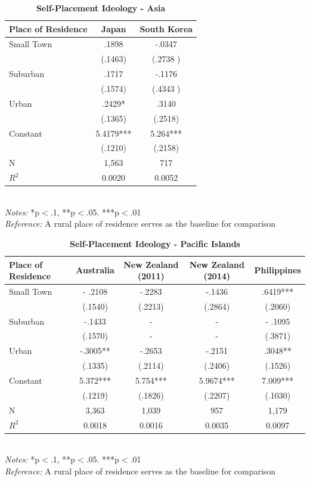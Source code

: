 \documentclass[12pt, titlepage]{article}
\newcommand\e{\emph}
\newcommand\tb{\textbf}
\begin{document}
\begin{table}[H]
	\centering 
	\caption{\tb{Self-Placement Ideology - Asia}}
	\begin{tabulary}{\linewidth}{l c c}
	\\
	\hline
	\tb{Place of Residence} & \tb{Japan} & \tb{South Korea}\\
	\hline
	Small Town &.1898 & -.0347 \\
	&(.1463) & (.2738 )\\
	Suburban&.1717 & -.1176 \\
	& (.1574) & (.4343 )\\
	Urban & .2429* &.3140 \\
	& (.1365) & (.2518)\\
	Constant& 5.4179*** & 5.264*** \\
	& (.1210) & (.2158)\\
	N&1,563 & 717\\
	$R^2$& 0.0020 & 0.0052\\
	\hline
	\end{tabulary}
\\
\e{Notes:} *p$<$.1, **p$<$.05. ***p$<$.01 \\
\e{Reference:} A rural place of residence serves as the baseline for comparison
\label{table12}
\end{table}

\begin{landscape}
\begin{table}
	\centering
	\def\arraystretch{1.5}
	\caption{\tb{Self-Placement Ideology - Pacific Islands}}
	\begin{tabulary}{\linewidth}{l c c c c}
		\\
		\hline
		\tb{Place of Residence}&\tb{Australia}&\tb{New Zealand (2011)}&\tb{New Zealand (2014)} &\tb{Philippines}\\
		\hline
		Small Town  & - .2108  & -.2283  &-.1436 &  .6419***  \\      
		& (.1540)   & (.2213) & (.2864)  & (.2060)    \\
		Suburban  & -.1433   & -   & -    & - .1095   \\ 
		& (.1570)   & -  & -    & (.3871)       \\
		Urban  & -.3005** & -.2653  & -.2151 & .3048** \\
		& (.1335) &(.2114)   & (.2406) & (.1526)      \\
		Constant   & 5.372***   & 5.754*** & 5.9674***  & 7.009***   \\
		&(.1219)&(.1826)&(.2207)&(.1030) \\
		N 	 & 3,363   &1,039    & 957   & 1,179  \\
		$R^2$  & 0.0018   &0.0016  &0.0035  &0.0097     \\
		\hline                                       
	\end{tabulary} 
	\\
	\e{Notes:} *p$<$.1, **p$<$.05. ***p$<$.01 \\
	\e{Reference:} A rural place of residence serves as the baseline for comparison
	\label{table13}
\end{table}
\end{landscape}
\end{document}
